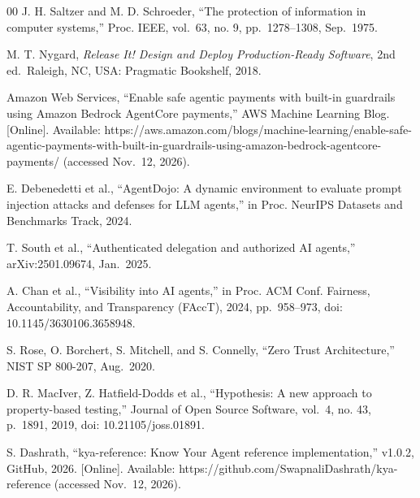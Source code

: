 \documentclass[conference]{IEEEtran}
\begin{document}
\begin{thebibliography}{00}
 J. H. Saltzer and M. D. Schroeder, ``The protection of information in computer systems,'' Proc. IEEE, vol.~63, no. 9, pp.~1278--1308, Sep.~1975.

 M. T. Nygard, \emph{Release It! Design and Deploy Production-Ready Software}, 2nd ed.~Raleigh, NC, USA: Pragmatic Bookshelf, 2018.

 Amazon Web Services, ``Enable safe agentic payments with built-in guardrails using Amazon Bedrock AgentCore payments,'' AWS Machine Learning Blog. {[}Online{]}. Available: https://aws.amazon.com/blogs/machine-learning/enable-safe-agentic-payments-with-built-in-guardrails-using-amazon-bedrock-agentcore-payments/ (accessed Nov.~12, 2026).

 E. Debenedetti et al., ``AgentDojo: A dynamic environment to evaluate prompt injection attacks and defenses for LLM agents,'' in Proc. NeurIPS Datasets and Benchmarks Track, 2024.

 T. South et al., ``Authenticated delegation and authorized AI agents,'' arXiv:2501.09674, Jan.~2025.

 A. Chan et al., ``Visibility into AI agents,'' in Proc. ACM Conf. Fairness, Accountability, and Transparency (FAccT), 2024, pp.~958--973, doi: 10.1145/3630106.3658948.

 S. Rose, O. Borchert, S. Mitchell, and S. Connelly, ``Zero Trust Architecture,'' NIST SP 800-207, Aug.~2020.

 D. R. MacIver, Z. Hatfield-Dodds et al., ``Hypothesis: A new approach to property-based testing,'' Journal of Open Source Software, vol.~4, no. 43, p.~1891, 2019, doi: 10.21105/joss.01891.

 S. Dashrath, ``kya-reference: Know Your Agent reference implementation,'' v1.0.2, GitHub, 2026. {[}Online{]}. Available: https://github.com/SwapnaliDashrath/kya-reference (accessed Nov.~12, 2026).
\end{thebibliography}
\end{document}
